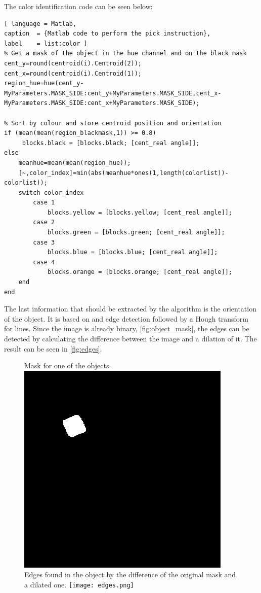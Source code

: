 The color identification code can be seen below:
%
\begin{lstlisting}[ language = Matlab,
caption  = {Matlab code to perform the pick instruction},
label    = list:color ]
% Get a mask of the object in the hue channel and on the black mask
cent_y=round(centroid(i).Centroid(2));
cent_x=round(centroid(i).Centroid(1));
region_hue=hue(cent_y-MyParameters.MASK_SIDE:cent_y+MyParameters.MASK_SIDE,cent_x-MyParameters.MASK_SIDE:cent_x+MyParameters.MASK_SIDE);

% Sort by colour and store centroid position and orientation
if (mean(mean(region_blackmask,1)) >= 0.8)
     blocks.black = [blocks.black; [cent_real angle]];
else
    meanhue=mean(mean(region_hue));
    [~,color_index]=min(abs(meanhue*ones(1,length(colorlist))-colorlist));
    switch color_index
        case 1
            blocks.yellow = [blocks.yellow; [cent_real angle]];
        case 2
            blocks.green = [blocks.green; [cent_real angle]];
        case 3
            blocks.blue = [blocks.blue; [cent_real angle]];
        case 4
            blocks.orange = [blocks.orange; [cent_real angle]];
    end
end
\end{lstlisting}

The last information that should be extracted by the algorithm is the orientation of the object. It is based on and edge detection followed by a Hough transform for lines. Since the image is already binary, \autoref{fig:object_mask}, the edges can be detected by calculating the difference between the image and a dilation of it. The result can be seen in \autoref{fig:edges}.
%
\begin{figure}[H]
	\captionbox  %
	{
		Mask for one of the objects.              
		\label{fig:object_mask}                                  
	}                                                                 
	{                                                                  
		\includegraphics[width=.25\textwidth]{figures/object_mask.png}         
	}                                                                    
	\hspace{5pt}                                                          
	\captionbox
	{       
		Edges found in the object by the difference of the original mask and a dilated one.
		\label{fig:edges}                                     
	}
	{
		\texttt{[image: edges.png]}            
	}                                                                              
\end{figure}

